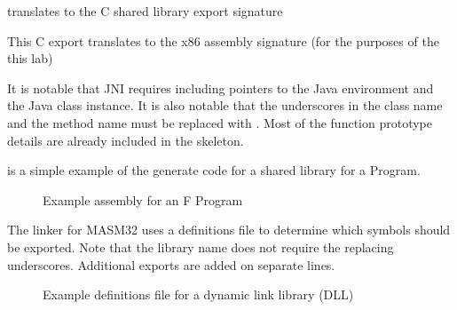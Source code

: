 
\noindent
%
translates to the C shared library export signature 


\noindent
%
This C export translates to the x86 assembly signature (for the purposes of the this lab) 


\noindent
%
It is notable that JNI requires including pointers to the Java environment and the Java class instance. It is also notable that the underscores in the class name and the method name must be replaced with . Most of the function prototype details are already included in the skeleton.
%

 is a simple example of the generate code for a shared library for a \F Program.

\begin{figure}
\label{fig:SimulatorExample.asm}
\caption{Example assembly for an F Program}

\end{figure}

 The linker for MASM32 uses a definitions file to determine which symbols should be exported. Note that the library name does not require the replacing underscores. Additional exports are added on separate lines.

\begin{figure}
\label{fig:SimulatorExample.def}
\caption{Example definitions file for a dynamic link library (DLL)}

\end{figure}


